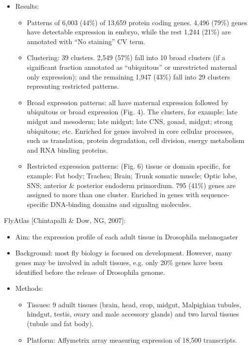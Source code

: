 \documentclass{report}
\begin{document}
\begin{enumerate}
\begin{itemize}
		\item Results: 
		\begin{itemize}
			\item Patterns of 6,003 (44\%) of 13,659 protein coding genes. 4,496 (79\%) genes have detectable expression in embryo, while the rest 1,244 (21\%) are annotated with ``No staining'' CV term. 
			\item Clustering: 39 clusters. 2,549 (57\%) fall into 10 broad clusters (if a significant fraction annotated as ``ubiquitous'' or unrestricted maternal only expression); and the remaining 1,947 (43\%) fall into 29 clusters represnting restricted patterns.
			\item Broad expression patterns: all have maternal expression followed by ubiquitous or broad expression (Fig. 4). The clusters, for example: late midgut and mesoderm; late midgut; late CNS, gonad, midgut; strong ubiquitous; etc. Enriched for genes involved in core cellular processes, such as translation, protein degradation, cell division, energy metabolism and RNA binding proteins. 
			\item Restricted expression patterns: (Fig. 6) tissue or domain specific, for example: Fat body; Trachea; Brain; Trunk somatic muscle; Optic lobe, SNS; anterior \& posterior endoderm primordium. 795 (41\%) genes are assigned to more than one cluster. Enriched in genes with sequence-specific DNA-binding domains and signaling molecules.  
		\end{itemize}
	\end{itemize}
	
	FlyAtlas [Chintapalli \& Dow, NG, 2007]:
	\begin{itemize}
		\item Aim: the expression profile of each adult tissue in Drosophila melanogaster
		
		\item Background: most fly biology is focused on development. However, many genes may be involved in adult tissues, e.g. only 20\% genes have been identified before the release of Drosophila genome. 
		
		\item Methods: 
		\begin{itemize}
			\item Tissues: 9 aduilt tissues (brain, head, crop, midgut, Malpighian tubules, hindgut, testis, ovary and male accessory glands) and two larval tissues (tubule and fat body). 
			\item Platform: Affymetrix array measuring expression of 18,500 transcripts. 
		\end{itemize}
		

\end{itemize}
\end{enumerate}
\end{document}
